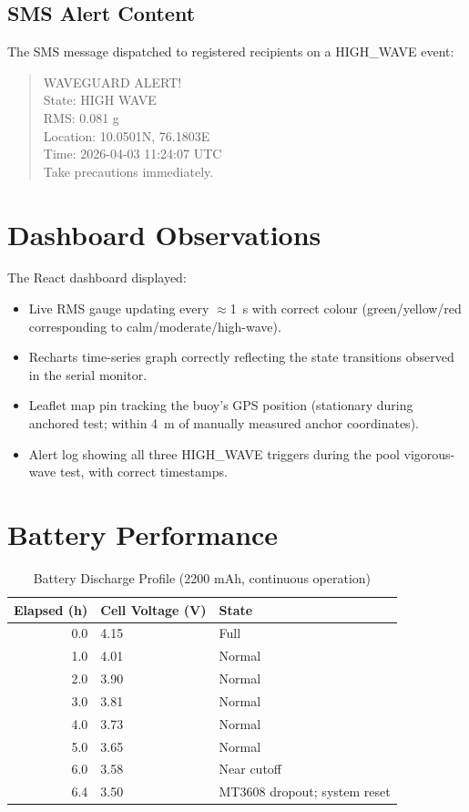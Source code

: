 \subsection{SMS Alert Content}

The SMS message dispatched to registered recipients on a HIGH\_WAVE event:

\begin{quote}
\ttfamily
WAVEGUARD ALERT!\\
State: HIGH WAVE\\
RMS: 0.081 g\\
Location: 10.0501N, 76.1803E\\
Time: 2026-04-03 11:24:07 UTC\\
Take precautions immediately.
\end{quote}

\section{Dashboard Observations}

The React dashboard displayed:
\begin{itemize}
  \item Live RMS gauge updating every $\approx$1~s with correct colour
        (green/yellow/red corresponding to calm/moderate/high-wave).
  \item Recharts time-series graph correctly reflecting the state transitions
        observed in the serial monitor.
  \item Leaflet map pin tracking the buoy's GPS position (stationary during
        anchored test; within 4~m of manually measured anchor coordinates).
  \item Alert log showing all three HIGH\_WAVE triggers during the pool vigorous-wave
        test, with correct timestamps.
\end{itemize}

\section{Battery Performance}

\begin{table}[H]
\centering
\caption{Battery Discharge Profile (2200 mAh, continuous operation)}
\label{tab:battery_discharge}
\begin{tabular}{rll}
\toprule
\textbf{Elapsed (h)} & \textbf{Cell Voltage (V)} & \textbf{State} \\
\midrule
0.0  & 4.15 & Full \\
1.0  & 4.01 & Normal \\
2.0  & 3.90 & Normal \\
3.0  & 3.81 & Normal \\
4.0  & 3.73 & Normal \\
5.0  & 3.65 & Normal \\
6.0  & 3.58 & Near cutoff \\
6.4  & 3.50 & MT3608 dropout; system reset \\
\bottomrule
\end{tabular}
\end{table}

